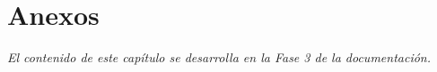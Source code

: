 \chapter{Anexos}\label{cap:anexos}

\textit{El contenido de este capítulo se desarrolla en la Fase 3 de la documentación.}
